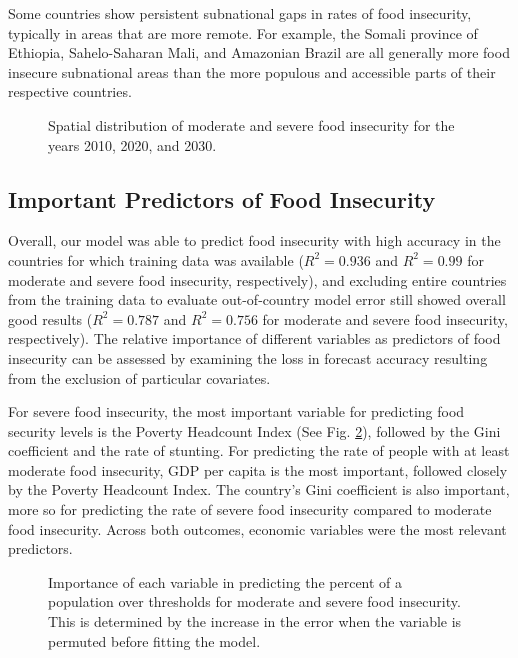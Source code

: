 \documentclass[titlepage]{article}
\begin{document}
Some countries show persistent subnational gaps in rates of food insecurity, typically in areas that are more remote.  For example, the Somali province of Ethiopia, Sahelo-Saharan Mali, and Amazonian Brazil are all generally more food insecure subnational areas than the more populous and accessible parts of their respective countries.


\begin{landscape}
\begin{figure}[h]
  \centering
  \caption{Spatial distribution of moderate and severe food insecurity for the years 2010, 2020, and 2030.}
  \label{fig:map}
\end{figure}
\end{landscape}

\subsection{Important Predictors of Food Insecurity}
Overall, our model was able to predict food insecurity with high accuracy in the countries for which training data was available ($R^2 = 0.936$ and $R^2 = 0.99$ for moderate and severe food insecurity, respectively), and excluding entire countries from the training data to evaluate out-of-country model error still showed overall good results ($R^2 = 0.787$ and $R^2 = 0.756$ for moderate and severe food insecurity, respectively).  The relative importance of different variables as predictors of food insecurity can be assessed by examining the loss in forecast accuracy resulting from the exclusion of particular covariates.

For severe food insecurity, the most important variable for predicting food security levels is the Poverty Headcount Index (See Fig. \ref{fig:vimp}), followed by the Gini coefficient and the rate of stunting.  For predicting the rate of people with at least moderate food insecurity, GDP per capita is the most important, followed closely by the Poverty Headcount Index.  The country's Gini coefficient is also important, more so for predicting the rate of severe food insecurity compared to moderate food insecurity.  Across both outcomes, economic variables were the most relevant predictors.

\begin{figure}[H]
  \centering
  \caption{Importance of each variable in predicting the percent of a population over thresholds for moderate and severe food insecurity.  This is determined by the increase in the error when the variable is permuted before fitting the model.}
  \label{fig:vimp}
\end{figure}
\end{document}
